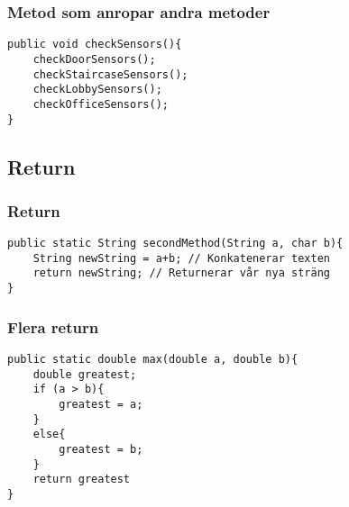 \documentclass[aspectratio=169]{beamer}
\begin{document}
\begin{frame}[fragile]
    \frametitle{Metod som anropar andra metoder}


    \begin{lstlisting}
public void checkSensors(){
    checkDoorSensors();
    checkStaircaseSensors();
    checkLobbySensors();
    checkOfficeSensors();
}
    \end{lstlisting}



\end{frame}

\subsection{Return}

\begin{frame}[fragile]
    \frametitle{Return}


    \begin{lstlisting}
public static String secondMethod(String a, char b){
    String newString = a+b; // Konkatenerar texten
    return newString; // Returnerar vår nya sträng
}
    \end{lstlisting}


\end{frame}

\begin{frame}[fragile]
    \frametitle{Flera return}


    \begin{lstlisting}
public static double max(double a, double b){
    double greatest;
    if (a > b){
        greatest = a;
    }
    else{
        greatest = b;
    }
    return greatest
}
    \end{lstlisting}

\end{frame}
\end{document}
